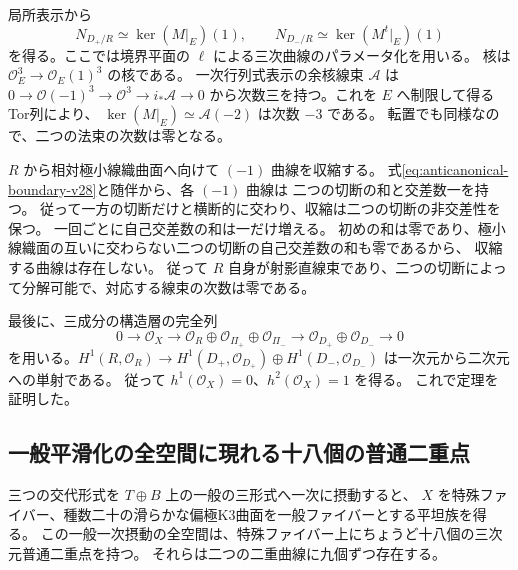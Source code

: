局所表示から
\[
 N_{D_+/R}\simeq\ker(M|_E)(1),\qquad
 N_{D_-/R}\simeq\ker(M^t|_E)(1)
\]
を得る。ここでは境界平面の $\ell$ による三次曲線のパラメータ化を用いる。
核は $\mathcal O_E^3\to\mathcal O_E(1)^3$ の核である。
一次行列式表示の余核線束 $\mathcal A$ は
$0\to\mathcal O(-1)^3\to\mathcal O^3\to i_*\mathcal A\to0$
から次数三を持つ。これを $E$ へ制限して得るTor列により、
$\ker(M|_E)\simeq\mathcal A(-2)$ は次数 $-3$ である。
転置でも同様なので、二つの法束の次数は零となる。

$R$ から相対極小線織曲面へ向けて $(-1)$ 曲線を収縮する。
式\eqref{eq:anticanonical-boundary-v28}と随伴から、各 $(-1)$ 曲線は
二つの切断の和と交差数一を持つ。
従って一方の切断だけと横断的に交わり、収縮は二つの切断の非交差性を保つ。
一回ごとに自己交差数の和は一だけ増える。
初めの和は零であり、極小線織面の互いに交わらない二つの切断の自己交差数の和も零であるから、
収縮する曲線は存在しない。
従って $R$ 自身が射影直線束であり、二つの切断によって分解可能で、対応する線束の次数は零である。

最後に、三成分の構造層の完全列
\[
 0\to\mathcal O_X\to
 \mathcal O_R\oplus\mathcal O_{\Pi_+}\oplus\mathcal O_{\Pi_-}
 \to\mathcal O_{D_+}\oplus\mathcal O_{D_-}\to0
\]
を用いる。$H^1(R,\mathcal O_R)\to
H^1(D_+,\mathcal O_{D_+})\oplus H^1(D_-,\mathcal O_{D_-})$
は一次元から二次元への単射である。
従って $h^1(\mathcal O_X)=0$、$h^2(\mathcal O_X)=1$ を得る。
これで定理を証明した。

\subsection{一般平滑化の全空間に現れる十八個の普通二重点}

\begin{corollary}[平滑化と二重曲線の九点ずつの零点]
\label{cor:eighteen-smoothing-nodes-v28}
三つの交代形式を $T\oplus B$ 上の一般の三形式へ一次に摂動すると、
$X$ を特殊ファイバー、種数二十の滑らかな偏極K3曲面を一般ファイバーとする平坦族を得る。
この一般一次摂動の全空間は、特殊ファイバー上にちょうど十八個の三次元普通二重点を持つ。
それらは二つの二重曲線に九個ずつ存在する。
\end{corollary}

